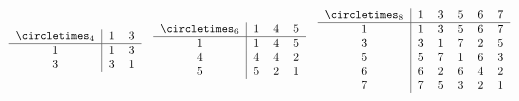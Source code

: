 \small
\begin{align*}
	&\begin{tabular}{c|cc}
		\circletimes$_4$ & 1 & 3 \\
		\hline
		1 & 1 & 3 \\
		3 & 3 & 1 \\
	\end{tabular}
	&\begin{tabular}{c|ccc}
		\circletimes$_6$ & 1 & 4 & 5 \\
		\hline
		1 & 1 & 4 & 5 \\
		4 & 4 & 4 & 2 \\
		5 & 5 & 2 & 1 \\
	\end{tabular}
	& &\begin{tabular}{c|ccccc}
		\circletimes$_8$ & 1 & 3 & 5 & 6 & 7 \\
		\hline
		1 & 1 & 3  & 5 & 6 & 7 \\
		3 & 3 & 1 & 7 & 2 & 5 \\
		5 & 5 & 7 & 1 & 6 & 3 \\
		6 & 6 & 2 & 6 & 4 & 2 \\
		7 & 7 & 5 & 3 & 2 & 1 \\
	\end{tabular}
\end{align*}